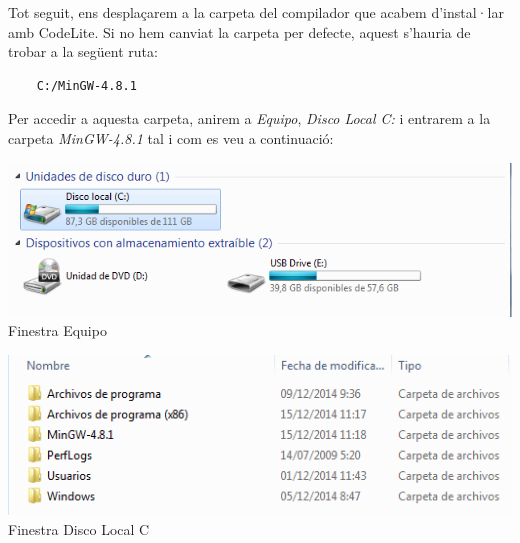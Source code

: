 \documentclass[11pt]{article}
\begin{document}
\noindent Tot seguit, ens desplaçarem a la carpeta del compilador que acabem d'instal·lar amb CodeLite. Si no hem canviat la carpeta per defecte, aquest s'hauria de trobar a la següent ruta:

\begin{verbatim}
	C:/MinGW-4.8.1
\end{verbatim}

\noindent Per accedir a aquesta carpeta, anirem a \textit{Equipo}, \textit{Disco Local C:} i entrarem a la carpeta \textit{MinGW-4.8.1} tal i com es veu a continuació:\\

\begin{center}

\includegraphics[scale=0.4]{img/Equipo.png}\\
\small{Finestra Equipo}\\

\vfill

\includegraphics[scale=0.4]{img/MinGW.png}\\
\small{Finestra Disco Local C}\\

\vfill


\end{center}
\end{document}
